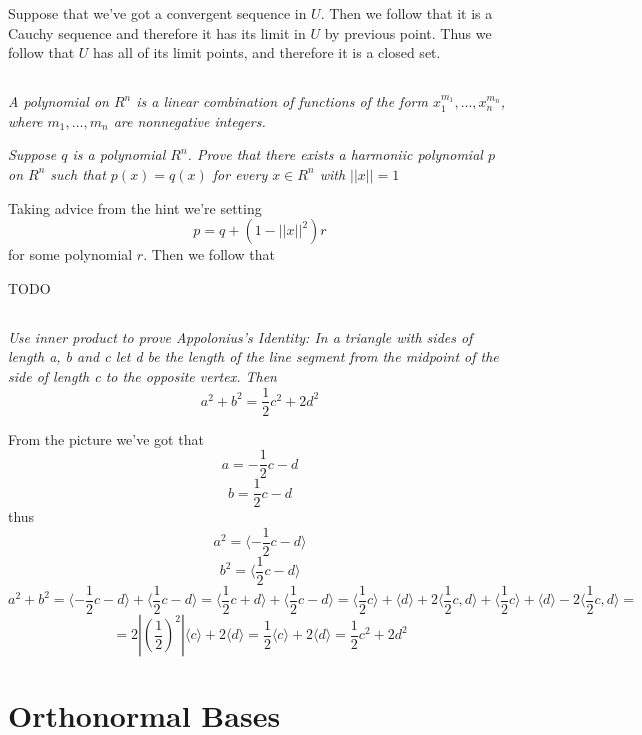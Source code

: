 \documentclass[11pt,oneside,titlepage]{book}
\newcommand{\eangle}[1]{\langle #1 \rangle}
\begin{document}
Suppose that we've got a convergent sequence in $U$. Then we follow that it is a Cauchy sequence
and therefore it has its limit in $U$ by previous point. Thus we follow that $U$ has
all of its limit points, and therefore it is a closed set.

\subsection{}

\textit{A polynomial on $R^n$ is a linear combination of functions of the form
  $x_1^{m_1}, ..., x_n^{m_n}$, where $m_1, ..., m_n$ are nonnegative integers.}

\textit{Suppose $q$ is a polynomial $R^n$.
  Prove that there exists a harmoniic polynomial $p$ on $R^n$ such that
  $p(x) = q(x)$ for every $x \in R^n$ with $||x|| = 1$}

Taking advice from the hint we're setting
$$p = q + (1 - ||x||^2)r$$
for some polynomial $r$. Then we follow that

TODO

\subsection{}

\textit{Use inner product to prove Appolonius's Identity: In a triangle with sides of length a, b
  and c let d be the length of the line segment from the midpoint of the side of length c to the
  opposite vertex. Then}
$$a^2 + b^2 = \frac{1}{2} c^2 + 2d^2$$

From the picture we've got that
$$a = - \frac{1}{2}c - d$$
$$b = \frac{1}{2}c - d$$
thus
$$a^2 = \eangle{- \frac{1}{2}c - d}$$
$$b^2 = \eangle{\frac{1}{2}c - d}$$
$$a^2 + b^2 = \eangle{-\frac{1}{2}c - d} + \eangle{\frac{1}{2}c - d} =
\eangle{\frac{1}{2}c + d} + \eangle{\frac{1}{2}c - d} =
\eangle{\frac 1 2 c} + \eangle{d} + 2\eangle{\frac{1}{2}c, d} + \eangle{\frac{1}{2}c} + \eangle{d}
- 2\eangle{\frac{1}{2}c, d} = $$
$$ = 2|(\frac{1}{2})^2|\eangle{ c} + 2\eangle{d}  = \frac{1}{2} \eangle{c} + 2\eangle{d} =
\frac{1}{2}c^2 + 2d^2$$

\section{Orthonormal Bases}

\subsection{}
\end{document}
